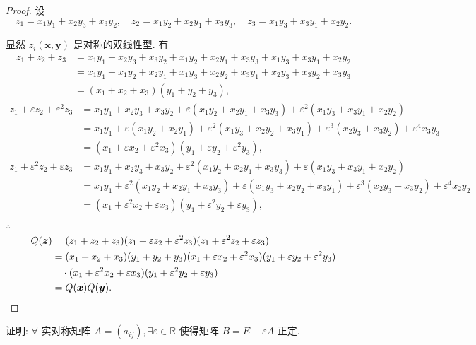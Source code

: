 \documentclass{ctexart}
\begin{document}
\begin{proof}
    设
    \[z_1=x_1y_1+x_2y_3+x_3y_2,\quad z_2=x_1y_2+x_2y_1+x_3y_3,\quad z_3=x_1y_3+x_3y_1+x_2y_2.\]

    显然 $z_i(\boldsymbol{x},\boldsymbol{y})$ 是对称的双线性型. 有
    \begin{align*}
        z_1+z_2+z_3 & =x_1y_1+x_2y_3+x_3y_2+x_1y_2+x_2y_1+x_3y_3+x_1y_3+x_3y_1+x_2y_2 \\
        & =x_1y_1+x_1y_2+x_2y_1+x_1y_3+x_2y_2+x_3y_1+x_2y_3+x_3y_2+x_3y_3 \\
        & =(x_1+x_2+x_3)(y_1+y_2+y_3),
    \end{align*}
    \begin{align*}
        z_1+\varepsilon z_2+\varepsilon^2z_3 & =x_1y_1+x_2y_3+x_3y_2+\varepsilon(x_1y_2+x_2y_1+x_3y_3)+\varepsilon^2(x_1y_3+x_3y_1+x_2y_2) \\
        & =x_1y_1+\varepsilon(x_1y_2+x_2y_1)+\varepsilon^2(x_1y_3+x_2y_2+x_3y_1)+\varepsilon^3(x_2y_3+x_3y_2)+\varepsilon^4x_3y_3 \\
        & =(x_1+\varepsilon x_2+\varepsilon^2x_3)(y_1+\varepsilon y_2+\varepsilon^2y_3),
    \end{align*}
    \begin{align*}
        z_1+\varepsilon^2z_2+\varepsilon z_3 & =x_1y_1+x_2y_3+x_3y_2+\varepsilon^2(x_1y_2+x_2y_1+x_3y_3)+\varepsilon(x_1y_3+x_3y_1+x_2y_2) \\
        & =x_1y_1+\varepsilon^2(x_1y_2+x_2y_1+x_3y_3)+\varepsilon(x_1y_3+x_2y_2+x_3y_1)+\varepsilon^3(x_2y_3+x_3y_2)+\varepsilon^4x_2y_2 \\
        & =(x_1+\varepsilon^2x_2+\varepsilon x_3)(y_1+\varepsilon^2y_2+\varepsilon y_3),
    \end{align*}

    $\therefore$
    \begin{align*}
        Q(\boldsymbol{z}) & =(z_1+z_2+z_3)(z_1+\varepsilon z_2+\varepsilon^2z_3)(z_1+\varepsilon^2z_2+\varepsilon z_3) \\
        & =(x_1+x_2+x_3)(y_1+y_2+y_3)(x_1+\varepsilon x_2+\varepsilon^2x_3)(y_1+\varepsilon y_2+\varepsilon^2y_3) \\
        & \quad\cdot(x_1+\varepsilon^2x_2+\varepsilon x_3)(y_1+\varepsilon^2y_2+\varepsilon y_3) \\
        & =Q(\boldsymbol{x})Q(\boldsymbol{y}).\qedhere
    \end{align*}
\end{proof}
\begin{exercise}%
    证明: $\forall$ 实对称矩阵 $A=(a_{ij}),\exists\varepsilon\in\mathbb{R}$ 使得矩阵 $B=E+\varepsilon A$ 正定.
\end{exercise}
\end{document}
